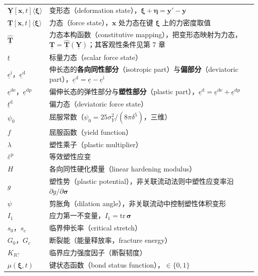 \begin{longtable}{@{}p{4.8cm}>{\raggedright\arraybackslash}p{10.2cm}@{}}
  $\underline{\mathbf{Y}}[\mathbf{x},t]\langle\boldsymbol{\xi}\rangle$ & 变形态（deformation state），$\boldsymbol{\xi}+\boldsymbol{\eta}=\mathbf{y}'-\mathbf{y}$ \\
  $\underline{\mathbf{T}}[\mathbf{x},t]\langle\boldsymbol{\xi}\rangle$ & 力态（force state），$\mathbf{x}$ 处力态在键 $\boldsymbol{\xi}$ 上的力密度取值 \\
  $\hat{\underline{\mathbf{T}}}$ & 力态本构函数（constitutive mapping），把变形态映射为力态，$\underline{\mathbf{T}}=\hat{\underline{\mathbf{T}}}(\underline{\mathbf{Y}})$；其客观性条件见第 7 章 \\
  $\underline{t}$ & 标量力态（scalar force state） \\
  $\underline{e}^{\mathrm{i}}$，$\underline{e}^{\mathrm{d}}$ & 伸长态的\textbf{各向同性部分}（isotropic part）与\textbf{偏部分}（deviatoric part），$\underline{e}^{\mathrm{d}}=\underline{e}-\underline{e}^{\mathrm{i}}$ \\
  $\underline{e}^{\mathrm{de}}$，$\underline{e}^{\mathrm{dp}}$ & 偏伸长态的弹性部分与\textbf{塑性部分}（plastic part），$\underline{e}^{\mathrm{d}}=\underline{e}^{\mathrm{de}}+\underline{e}^{\mathrm{dp}}$ \\
  $\underline{t}^{\mathrm{d}}$ & 偏力态（deviatoric force state） \\
  $\psi_{0}$ & 屈服常数（$\psi_{0}=25\sigma_{Y}^{2}/(8\pi\delta^{5})$，三维） \\
  $f$ & 屈服函数（yield function） \\
  $\lambda$ & 塑性乘子（plastic multiplier） \\
  $\bar{\varepsilon}^{\mathrm{p}}$ & 等效塑性应变 \\
  $H$ & 各向同性硬化模量（linear hardening modulus） \\
  $g$ & 塑性势（plastic potential），非关联流动法则中塑性应变率沿 $\partial g/\partial\boldsymbol{\sigma}$ \\
  $\psi$ & 剪胀角（dilation angle），非关联流动中控制塑性体积变形 \\
  $I_{1}$ & 应力第一不变量，$I_{1}=\mathrm{tr}\,\boldsymbol{\sigma}$ \\
  $s_{0}$，$s_{c}$ & 临界伸长率（critical stretch） \\
  $G_{0}$，$G_{c}$ & 断裂能（能量释放率，fracture energy） \\
  $K_{IC}$ & 临界应力强度因子（断裂韧度） \\
  $\mu(\boldsymbol{\xi},t)$ & 键状态函数（bond status function），$\in\{0,1\}$ \\

\end{longtable}
